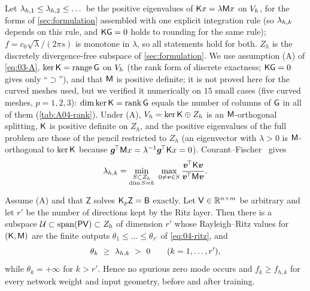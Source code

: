Let $\lamh_1\le\lamh_2\le\dots$ be the positive eigenvalues of $\mathsf{K} x=\lambda\mathsf{M} x$ on $V_h$, for the forms of \cref{sec:formulation} assembled with one explicit integration rule (so $\lamh_k$ depends on this rule, and $\mathsf{K}\mathsf{G}=0$ holds to rounding for the same rule); $f=c_0\sqrt\lambda/(2\pi s)$ is monotone in $\lambda$, so all statements hold for both.
$Z_h$ is the discretely divergence-free subspace of \cref{sec:formulation}.
We use assumption (A) of \cref{eq:03-A}, $\ker\mathsf{K}=\mathrm{range}\,\mathsf{G}$ on $V_h$ (the rank form of discrete exactness; $\mathsf{K}\mathsf{G}=0$ gives only ``$\supset$''), and that $\mathsf{M}$ is positive definite; it is not proved here for the curved meshes used, but we verified it numerically on $15$ small cases (five curved meshes, $p=1,2,3$): $\dim\ker\mathsf{K}=\operatorname{rank}\mathsf{G}$ equals the number of columns of $\mathsf{G}$ in all of them (\cref{tab:A04-rank}).
Under (A), $V_h=\ker\mathsf{K}\oplus Z_h$ is an $\mathsf{M}$-orthogonal splitting, $\mathsf{K}$ is positive definite on $Z_h$, and the positive eigenvalues of the full problem are those of the pencil restricted to $Z_h$ (an eigenvector with $\lambda>0$ is $\mathsf{M}$-orthogonal to $\ker\mathsf{K}$ because $\bm g^{\!\top}\mathsf{M} x=\lambda^{-1}\bm g^{\!\top}\mathsf{K} x=0$).
Courant--Fischer~\cite{parlett1998symmetric} gives
\begin{equation}\label{eq:04-minmax}
  \lamh_k=\min_{\substack{S\subset Z_h\\ \dim S=k}}\ \max_{0\ne\bm v\in S}\frac{\bm v^{\!\top}\Kmat\bm v}{\bm v^{\!\top}\Mmat\bm v}.
\end{equation}

\begin{proposition}\label{prop:upper-bound}
Assume (A) and that $\mathsf Z$ solves $\Kp\mathsf Z=\mathsf B$ exactly.
Let $\mathsf{V}\in\mathbb{R}^{n\times m}$ be arbitrary and let $r'$ be the number of directions kept by the Ritz layer.
Then there is a subspace $\mathcal U\subset\operatorname{span}(\mathsf{P}\mathsf{V})\subset Z_h$ of dimension $r'$ whose Rayleigh--Ritz values for $(\mathsf{K},\mathsf{M})$ are the finite outputs $\theta_1\le\dots\le\theta_{r'}$ of \eqref{eq:04-ritz}, and
\[
  \theta_k\ \ge\ \lamh_k\ >\ 0\qquad(k=1,\dots,r'),
\]
while $\theta_k=+\infty$ for $k>r'$.
Hence no spurious zero mode occurs and $f_k\ge f_{h,k}$ for every network weight and input geometry, before and after training.
\end{proposition}

